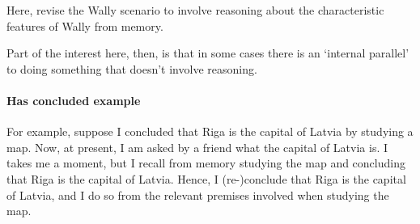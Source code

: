 \begin{note}
  {
    \color{red}
    Here, revise the Wally scenario to involve reasoning about the characteristic features of Wally from memory.

    Part of the interest here, then, is that in some cases there is an `internal parallel' to doing something that doesn't involve reasoning.
  }
\end{note}










\paragraph{Has concluded example}

\begin{note}
  For example, suppose I concluded that Riga is the capital of Latvia by studying a map.
  Now, at present, I am asked by a friend what the capital of Latvia is.
  I takes me a moment, but I recall from memory studying the map and concluding that Riga is the capital of Latvia.
  Hence, I (re-)conclude that Riga is the capital of Latvia, and I do so from the relevant premises involved when studying the map.
\end{note}

